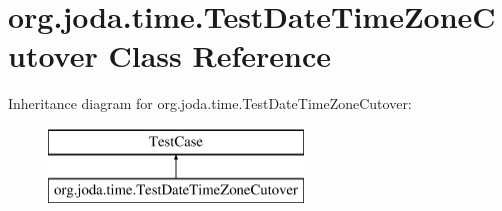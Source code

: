 \hypertarget{classorg_1_1joda_1_1time_1_1_test_date_time_zone_cutover}{\section{org.\-joda.\-time.\-Test\-Date\-Time\-Zone\-Cutover Class Reference}
\label{classorg_1_1joda_1_1time_1_1_test_date_time_zone_cutover}
}
Inheritance diagram for org.\-joda.\-time.\-Test\-Date\-Time\-Zone\-Cutover\-:\begin{figure}[H]
\begin{center}
\leavevmode
\includegraphics[height=2.000000cm]{classorg_1_1joda_1_1time_1_1_test_date_time_zone_cutover}
\end{center}
\end{figure}
